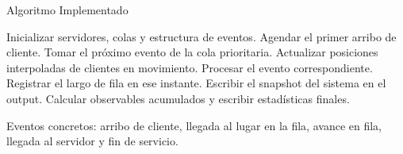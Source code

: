 \documentclass{beamer}
\begin{document}
\begin{frame}{Algoritmo Implementado}
    \begin{algorithm}[H]
    \small
        \caption{Loop principal de simulaci\'on dirigida por eventos}
        \begin{algorithmic}[1]
            \State Inicializar servidores, colas y estructura de eventos.
            \State Agendar el primer arribo de cliente.
                \State Tomar el pr\'oximo evento de la cola prioritaria.
                \State Actualizar posiciones interpoladas de clientes en movimiento.
                \State Procesar el evento correspondiente.
                \State Registrar el largo de fila en ese instante.
                \State Escribir el snapshot del sistema en el output.
            \EndWhile
            \State Calcular observables acumulados y escribir estad\'isticas finales.
        \end{algorithmic}
    \end{algorithm}

    \vspace{0.15cm}
    \footnotesize Eventos concretos: arribo de cliente, llegada al lugar en la fila, avance en fila, llegada al servidor y fin de servicio.
\end{frame}
\end{document}
